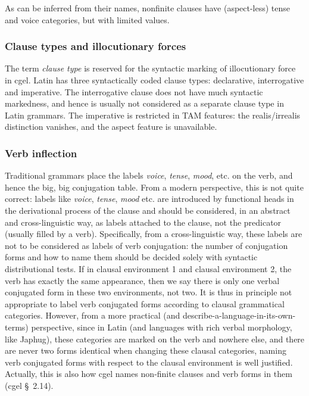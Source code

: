 \documentclass{article}
\newcommand*{\citesec}[1]{\S~{#1}}
\newcommand*{\term}[1]{\emph{#1}}
\begin{document}
As can be inferred from their names, nonfinite clauses have (aspect-less) tense and voice categories,
but with limited values.

\subsubsection{Clause types and illocutionary forces}\label{sec:force-abs}

The term \term{clause type} is reserved for the syntactic marking of illocutionary force in \ac{cgel}.
Latin has three syntactically coded clause types:
declarative, interrogative and imperative.
The interrogative clause does not have much syntactic markedness,
and hence is usually not considered as a separate clause type in Latin grammars.
The imperative is restricted in TAM features:
the realis/irrealis distinction vanishes,
and the aspect feature is unavailable.

\subsubsection{Verb inflection}\label{sec:verb-inflection-abs}

Traditional grammars place the labels \term{voice}, \term{tense}, \term{mood}, etc. on the verb,
and hence the big, big conjugation table.
From a modern perspective, this is not quite correct:
labels like \term{voice}, \term{tense}, \term{mood} etc. are introduced by functional heads 
in the derivational process of the clause 
and should be considered, in an abstract and cross-linguistic way, 
as labels attached to the clause, not the predicator (usually filled by a verb).
Specifically, from a cross-linguistic way,
these labels are not to be considered as labels of verb conjugation:
the number of conjugation forms and how to name them should be decided 
solely with syntactic distributional tests. 
If in clausal environment 1 and clausal environment 2,
the verb has exactly the same appearance,
then we say there is only one verbal conjugated form in these two environments, not two.
It is thus in principle not appropriate to label verb conjugated forms according to 
clausal grammatical categories.
However, from a more practical (and describe-a-language-in-its-own-terms) perspective,
since in Latin (and languages with rich verbal morphology, like Japhug), 
these categories are marked on the verb and nowhere else,
and there are never two forms identical when changing these clausal categories,
naming verb conjugated forms with respect to the clausal environment
is well justified.
Actually, this is also how \ac{cgel} names non-finite clauses and verb forms in them (\ac{cgel} \citesec{2.14}).
\end{document}
